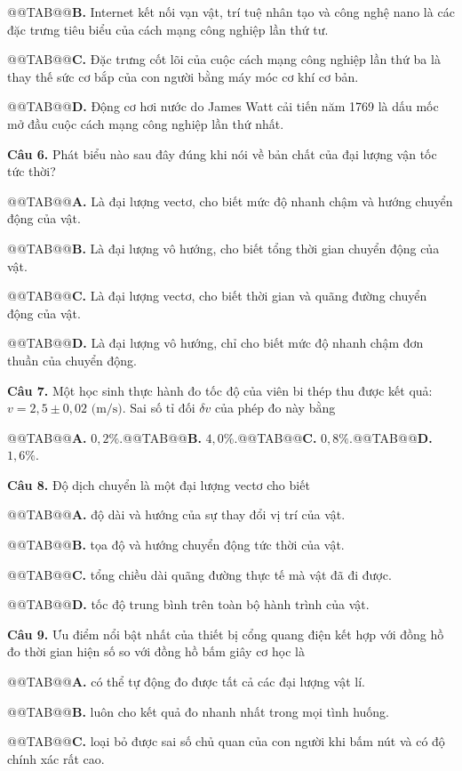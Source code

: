 \documentclass{article}
\begin{document}
@@TAB@@\textbf{B.} Internet kết nối vạn vật, trí tuệ nhân tạo và công nghệ nano là các đặc trưng tiêu biểu của cách mạng công nghiệp lần thứ tư.

@@TAB@@\textbf{C.} Đặc trưng cốt lõi của cuộc cách mạng công nghiệp lần thứ ba là thay thế sức cơ bắp của con người bằng máy móc cơ khí cơ bản.

@@TAB@@\textbf{D.} Động cơ hơi nước do James Watt cải tiến năm 1769 là dấu mốc mở đầu cuộc cách mạng công nghiệp lần thứ nhất.

\textbf{Câu 6.} Phát biểu nào sau đây đúng khi nói về bản chất của đại lượng vận tốc tức thời?

@@TAB@@\textbf{A.} Là đại lượng vectơ, cho biết mức độ nhanh chậm và hướng chuyển động của vật.

@@TAB@@\textbf{B.} Là đại lượng vô hướng, cho biết tổng thời gian chuyển động của vật.

@@TAB@@\textbf{C.} Là đại lượng vectơ, cho biết thời gian và quãng đường chuyển động của vật.

@@TAB@@\textbf{D.} Là đại lượng vô hướng, chỉ cho biết mức độ nhanh chậm đơn thuần của chuyển động.

\textbf{Câu 7.} Một học sinh thực hành đo tốc độ của viên bi thép thu được kết quả: $v = 2{,}5 \pm 0{,}02\text{ (m/s)}$. Sai số tỉ đối $\delta v$ của phép đo này bằng

@@TAB@@\textbf{A.} $0{,}2\%$.@@TAB@@\textbf{B.} $4{,}0\%$.@@TAB@@\textbf{C.} $0{,}8\%$.@@TAB@@\textbf{D.} $1{,}6\%$.

\textbf{Câu 8.} Độ dịch chuyển là một đại lượng vectơ cho biết

@@TAB@@\textbf{A.} độ dài và hướng của sự thay đổi vị trí của vật.

@@TAB@@\textbf{B.} tọa độ và hướng chuyển động tức thời của vật.

@@TAB@@\textbf{C.} tổng chiều dài quãng đường thực tế mà vật đã đi được.

@@TAB@@\textbf{D.} tốc độ trung bình trên toàn bộ hành trình của vật.

\textbf{Câu 9.} Ưu điểm nổi bật nhất của thiết bị cổng quang điện kết hợp với đồng hồ đo thời gian hiện số so với đồng hồ bấm giây cơ học là

@@TAB@@\textbf{A.} có thể tự động đo được tất cả các đại lượng vật lí.

@@TAB@@\textbf{B.} luôn cho kết quả đo nhanh nhất trong mọi tình huống.

@@TAB@@\textbf{C.} loại bỏ được sai số chủ quan của con người khi bấm nút và có độ chính xác rất cao.
\end{document}

